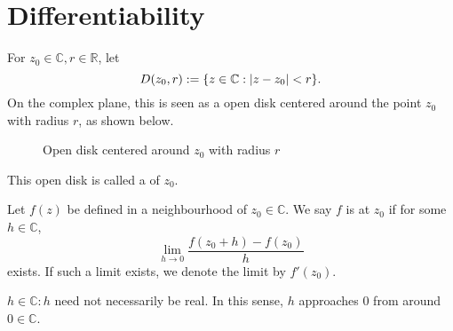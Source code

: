 \documentclass[11pt, oneside]{book}
\begin{document}

\section{Differentiability} %
\label{sec:differentiability}

\begin{defn}[Neighbourhood]\label{defn:Neighbourhood}
	For $z_0 \in \mathbb{C}, r \in \mathbb{R}$, let
	\begin{equation}\label{eq:neighbourhood_set}
		D(z_0, r) := \{ z \in \mathbb{C} : \left|z - z_0\right| < r \}.
	\end{equation}
	On the complex plane, this is seen as a open disk centered around the point $z_0$ with radius $r$, as shown below.
	\begin{figure}[H]
		\begin{center}
		\end{center}
		\caption[loftitle]{Open disk centered around $z_0$ with radius $r$}
		\label{figure:neighbourhood_open_disk}
	\end{figure}
	This open disk is called a  of $z_0$.
\end{defn}

\begin{defn}\label{defn:Differentiable/Holomorphic}
	Let $f(z)$ be defined in a neighbourhood of $z_0 \in \mathbb{C}$. We say $f$ is  at $z_0$ if for some $h \in \mathbb{C}$,
	\begin{equation}\label{eq:holomorphic}
		\lim_{h \to 0} \frac{f(z_0 + h) - f(z_0)}{h} 
	\end{equation}
	exists. If such a limit exists, we denote the limit by $f'(z_0)$.
\end{defn}

\begin{remark}
	$h \in \mathbb{C}: h$ need not necessarily be real. In this sense, $h$ approaches $0$ from  around $0 \in \mathbb{C}$.
\end{remark}
\end{document}
